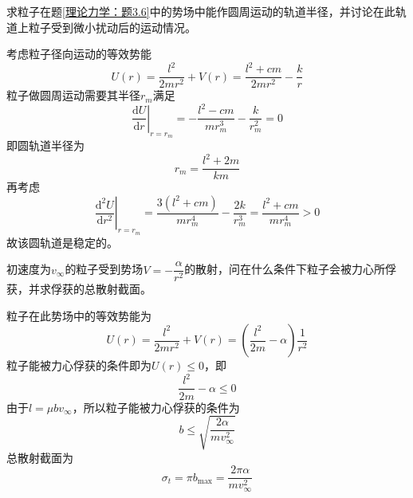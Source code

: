 \begin{question}
求粒子在题\ref{理论力学：题3.6}中的势场中能作圆周运动的轨道半径，并讨论在此轨道上粒子受到微小扰动后的运动情况。
\end{question}
\begin{solution}
考虑粒子径向运动的等效势能
\begin{equation*}
	U(r) = \frac{l^2}{2mr^2} + V(r) = \frac{l^2+cm}{2mr^2} - \frac{k}{r}
\end{equation*}
粒子做圆周运动需要其半径$r_m$满足
\begin{equation*}
	\left.\frac{\mathrm{d} U}{\mathrm{d} r}\right|_{r=r_m} = -\frac{l^2-cm}{mr_m^3} - \frac{k}{r_m^2} = 0
\end{equation*}
即圆轨道半径为
\begin{equation*}
	r_m = \frac{l^2+2m}{km}
\end{equation*}
再考虑
\begin{equation*}
	\left.\frac{\mathrm{d}^2 U}{\mathrm{d} r^2}\right|_{r=r_m} = \frac{3(l^2+cm)}{mr_m^4} - \frac{2k}{r_m^3} = \frac{l^2+cm}{mr_m^4} > 0
\end{equation*}
故该圆轨道是稳定的。
\end{solution}

\begin{question}
初速度为$v_\infty$的粒子受到势场$V=-\dfrac{\alpha}{r^2}$的散射，问在什么条件下粒子会被力心所俘获，并求俘获的总散射截面。
\end{question}
\begin{solution}
粒子在此势场中的等效势能为
\begin{equation*}
	U(r) = \frac{l^2}{2mr^2} + V(r) = \left(\frac{l^2}{2m}-\alpha\right) \frac{1}{r^2}
\end{equation*}
粒子能被力心俘获的条件即为$U(r) \leqslant 0$，即
\begin{equation*}
	\frac{l^2}{2m}-\alpha \leqslant 0
\end{equation*}
由于$l = \mu b v_\infty$，所以粒子能被力心俘获的条件为
\begin{equation*}
	b \leqslant \sqrt{\frac{2\alpha}{mv_\infty^2}}
\end{equation*}
总散射截面为
\begin{equation*}
	\sigma_t = \pi b_{\max} = \frac{2\pi\alpha}{mv_\infty^2}
\end{equation*}
\end{solution}

